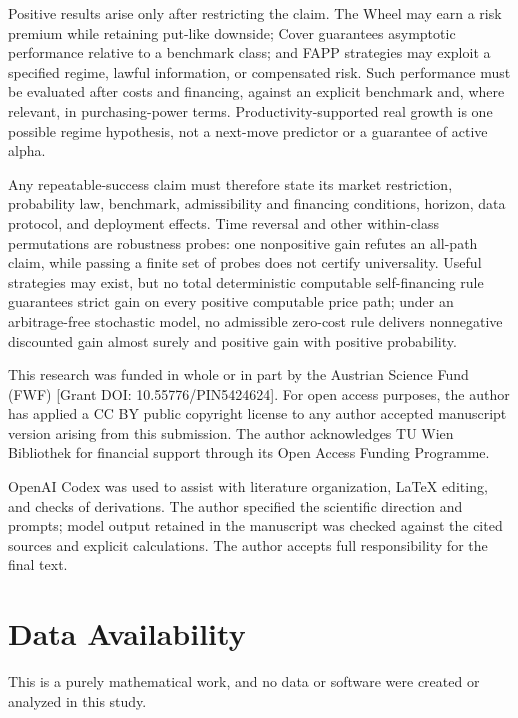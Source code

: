 \documentclass[aps,pra,reprint,superscriptaddress,amsmath,amssymb,floatfix]{revtex4-2}
\theoremstyle{plain}
\theoremstyle{definition}
\theoremstyle{remark}
\begin{document}
Positive results arise only after restricting the claim. The Wheel may earn a
risk premium while retaining put-like downside; Cover guarantees asymptotic
performance relative to a benchmark class; and FAPP strategies may exploit a
specified regime, lawful information, or compensated risk. Such performance
must be evaluated after costs and financing, against an explicit benchmark and,
where relevant, in purchasing-power terms. Productivity-supported real growth
is one possible regime hypothesis, not a next-move predictor or a guarantee of
active alpha.

Any repeatable-success claim must therefore state its market restriction,
probability law, benchmark, admissibility and financing conditions, horizon,
data protocol, and deployment effects. Time reversal and other within-class
permutations are robustness probes: one nonpositive gain refutes an all-path
claim, while passing a finite set of probes does not certify universality.
Useful strategies may exist, but no total deterministic computable
self-financing rule guarantees strict gain on every positive computable price
path; under an arbitrage-free stochastic model, no admissible zero-cost rule
delivers nonnegative discounted gain almost surely and positive gain with
positive probability.

\begin{acknowledgments}
This research was funded in whole or in part by the Austrian Science Fund
(FWF) [Grant DOI: 10.55776/PIN5424624]. For open access purposes, the author
has applied a CC BY public copyright license to any author accepted manuscript
version arising from this submission. The author acknowledges TU Wien
Bibliothek for financial support through its Open Access Funding Programme.

OpenAI Codex was used to assist with literature organization, LaTeX
editing, and checks of derivations. The author specified the scientific
direction and prompts; model output retained in the manuscript was checked
against the cited sources and explicit calculations. The author accepts full
responsibility for the final text.
\end{acknowledgments}

\section*{Data Availability}
This is a purely mathematical work, and no data or software were created or
analyzed in this study.

\clearpage

\end{document}
